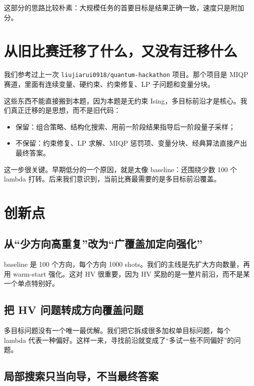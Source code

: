\documentclass[UTF8,zihao=-4]{ctexart}
\newcommand{\code}[1]{\texttt{#1}}
\begin{document}
这部分的思路比较朴素：大规模任务的首要目标是结果正确一致，速度只是附加分。

\section{从旧比赛迁移了什么，又没有迁移什么}

我们参考过上一次 \code{liujiarui0918/quantum-hackathon} 项目。那个项目是 MIQP 赛道，里面有连续变量、硬约束、约束修复、LP 子问题和变量分块。

这些东西不能直接搬到本题，因为本题是无约束 Ising，多目标前沿才是核心。我们真正迁移的是思想，而不是旧代码：

\begin{itemize}
  \item 保留：组合策略、结构化搜索、用前一阶段结果指导后一阶段量子采样；
  \item 不保留：约束修复、LP 求解、MIQP 惩罚项、变量分块、经典算法直接产出最终答案。
\end{itemize}

这一步很关键。早期低分的一个原因，就是太像 baseline：还围绕少数 100 个 lambda 打转。后来我们意识到，当前比赛最需要的是多目标前沿覆盖。

\section{创新点}

\subsection{从“少方向高重复”改为“广覆盖加定向强化”}

baseline 是 100 个方向，每个方向 1000 shots。我们的主线是先扩大方向数量，再用 warm-start 强化。这对 HV 很重要，因为 HV 奖励的是一整片前沿，而不是某一个单点特别好。

\subsection{把 HV 问题转成方向覆盖问题}

多目标问题没有一个唯一最优解。我们把它拆成很多加权单目标问题，每个 lambda 代表一种偏好。这样一来，寻找前沿就变成了“多试一些不同偏好”的问题。

\subsection{局部搜索只当向导，不当最终答案}
\end{document}
